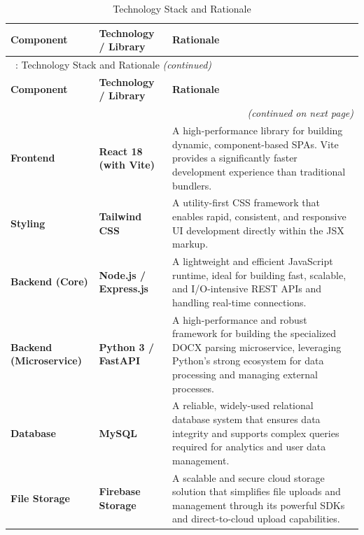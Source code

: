 \begin{longtable}{p{3cm} p{3cm} p{8cm}}
\caption{Technology Stack and Rationale} \label{tab:tech-stack} \\
\toprule
\textbf{Component} & \textbf{Technology / Library} & \textbf{Rationale} \\
\midrule
\endfirsthead

\multicolumn{3}{l}{\tablename\ \thetable{}: Technology Stack and Rationale \textit{(continued)}} \\
\toprule
\textbf{Component} & \textbf{Technology / Library} & \textbf{Rationale} \\
\midrule
\endhead

\midrule
\multicolumn{3}{r}{\textit{(continued on next page)}} \\
\endfoot

\bottomrule
\endlastfoot

\textbf{Frontend} & \textbf{React 18 (with Vite)} &
A high-performance library for building dynamic, component-based SPAs.
Vite provides a significantly faster development experience than traditional bundlers. \\[0.5em]

\textbf{Styling} & \textbf{Tailwind CSS} &
A utility-first CSS framework that enables rapid, consistent, and responsive UI development directly within the JSX markup. \\[0.5em]

\textbf{Backend (Core)} & \textbf{Node.js / Express.js} &
A lightweight and efficient JavaScript runtime, ideal for building fast, scalable, and I/O-intensive REST APIs and handling real-time connections. \\[0.5em]

\textbf{Backend (Microservice)} & \textbf{Python 3 / FastAPI} &
A high-performance and robust framework for building the specialized DOCX parsing microservice, leveraging Python's strong ecosystem for data processing and managing external processes. \\[0.5em]

\textbf{Database} & \textbf{MySQL} &
A reliable, widely-used relational database system that ensures data integrity and supports complex queries required for analytics and user data management. \\[0.5em]

\textbf{File Storage} & \textbf{Firebase Storage} &
A scalable and secure cloud storage solution that simplifies file uploads and management through its powerful SDKs and direct-to-cloud upload capabilities. \\[0.5em]


\end{longtable}
